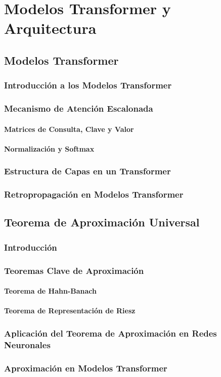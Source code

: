 \chapter{Modelos Transformer y Arquitectura}

\section{Modelos Transformer}
\subsection{Introducción a los Modelos Transformer}
\subsection{Mecanismo de Atención Escalonada}
\subsubsection{Matrices de Consulta, Clave y Valor}
\subsubsection{Normalización y Softmax}
\subsection{Estructura de Capas en un Transformer}
\subsection{Retropropagación en Modelos Transformer}

\section{Teorema de Aproximación Universal}
\subsection{Introducción}
\subsection{Teoremas Clave de Aproximación}
\subsubsection{Teorema de Hahn-Banach}
\subsubsection{Teorema de Representación de Riesz}
\subsection{Aplicación del Teorema de Aproximación en Redes Neuronales}
\subsection{Aproximación en Modelos Transformer}